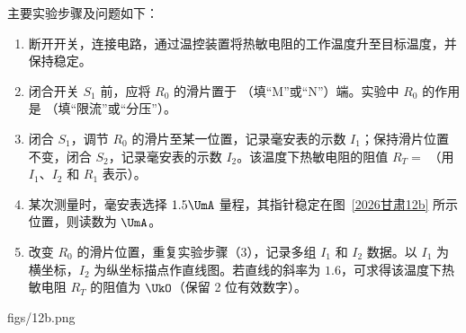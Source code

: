 \documentclass[\gkver]{gaokaozhenti}
\begin{document}
\begin{enumerate}
主要实验步骤及问题如下：
\begin{enumerate}
	\item
	断开开关，连接电路，通过温控装置将热敏电阻的工作温度升至目标温度，并保持稳定。
	\item
	闭合开关 $S_{1}$ 前，应将 $R_{0}$ 的滑片置于 （填“M”或“N”）端。实验中 $R_{0}$ 的作用是 （填“限流”或“分压”）。
	\item
	闭合 $S_{1}$，调节 $R_{0}$ 的滑片至某一位置，记录毫安表的示数 $I_{1}$；保持滑片位置不变，闭合 $S_{2}$，记录毫安表的示数 $I_{2}$。该温度下热敏电阻的阻值 $R_{T} =$ （用 $I_{1}$、$I_{2}$ 和 $R_{1}$ 表示）。
	\item
	某次测量时，毫安表选择 $1.5\UmA$ 量程，其指针稳定在图~\ref{2026甘肃12b} 所示位置，则读数为 $\UmA$。
	\item
	改变 $R_{0}$ 的滑片位置，重复实验步骤（3），记录多组 $I_{1}$ 和 $I_{2}$ 数据。以 $I_{1}$ 为横坐标，$I_{2}$ 为纵坐标描点作直线图。若直线的斜率为 $1.6$，可求得该温度下热敏电阻 $R_{T}$ 的阻值为 $\UkO$（保留 2 位有效数字）。
\end{enumerate}
{figs/12b.png}



\end{enumerate}
\end{document}
